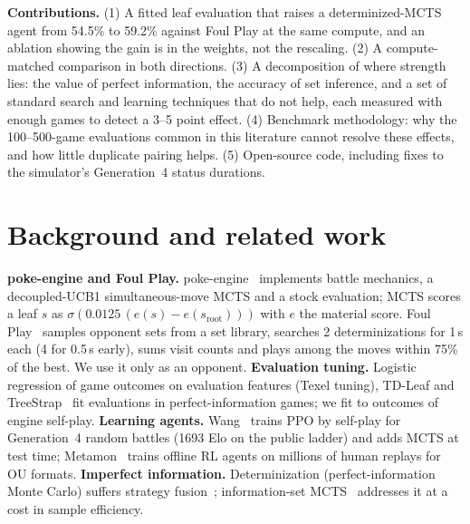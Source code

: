 \documentclass[conference]{IEEEtran}
\begin{document}
\textbf{Contributions.}
(1) A fitted leaf evaluation that raises a determinized-MCTS agent from 54.5\% to 59.2\% against Foul Play at the
same compute, and an ablation showing the gain is in the weights, not the rescaling.
(2) A compute-matched comparison in both directions.
(3) A decomposition of where strength lies: the value of perfect information, the accuracy of set inference, and a
set of standard search and learning techniques that do not help, each measured with enough games to detect a
3--5 point effect.
(4) Benchmark methodology: why the 100--500-game evaluations common in this literature cannot resolve these
effects, and how little duplicate pairing helps.
(5) Open-source code, including fixes to the simulator's Generation~4 status durations.

\section{Background and related work}
\textbf{poke-engine and Foul Play.} poke-engine~\cite{pokeengine} implements battle mechanics, a decoupled-UCB1
simultaneous-move MCTS and a stock evaluation; MCTS scores a leaf $s$ as
$\sigma(0.0125\,(e(s)-e(s_{\text{root}})))$ with $e$ the material score. Foul Play~\cite{foulplay} samples opponent
sets from a set library, searches 2 determinizations for 1\,s each (4 for 0.5\,s early), sums visit counts and
plays among the moves within 75\% of the best. We use it only as an opponent.
\textbf{Evaluation tuning.} Logistic regression of game outcomes on evaluation features (Texel tuning), TD-Leaf and
TreeStrap~\cite{treestrap} fit evaluations in perfect-information games; we fit to outcomes of engine self-play.
\textbf{Learning agents.} Wang~\cite{wang2024} trains PPO by self-play for Generation~4 random battles (1693 Elo on
the public ladder) and adds MCTS at test time; Metamon~\cite{metamon} trains offline RL agents on millions of human
replays for OU formats.
\textbf{Imperfect information.} Determinization (perfect-information Monte Carlo) suffers strategy
fusion~\cite{frank1998}; information-set MCTS~\cite{ismcts} addresses it at a cost in sample efficiency.
\end{document}
